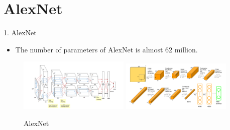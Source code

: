 \documentclass{beamer}
\begin{document}
\section{AlexNet}
\begin{frame}{1. AlexNet}
	\vspace{10pt}
	\begin{itemize}
		\item The number of parameters of AlexNet\cite{alexnet} is almost 62 million.
	\end{itemize}
	\vspace{10pt}
	\begin{figure}[h]		
		\centering
		{\includegraphics[page={1},width=0.47\textwidth]{./alex/Alexnet_1.PNG}}
		\quad
		{\includegraphics[page={2},width=0.47\textwidth]{./alex/AlexNet_2.PNG}}
		\caption{AlexNet}
		\label{Alexnet}
	\end{figure}
\end{frame}
\end{document}
